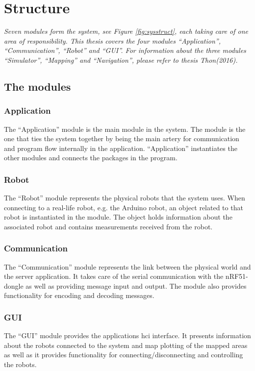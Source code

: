 \section{Structure}
\textit{Seven modules form the system, see Figure \ref{fig:sysstruct}, each taking care of one area of responsibility. This thesis covers the four modules ``Application'', ``Communication'', ``Robot'' and ``GUI''. For information about the three modules ``Simulator'', ``Mapping'' and ``Navigation'', please refer to thesis Thon(2016).}

\subsection{The modules}
\subsubsection{Application}
The ``Application'' module is the main module in the system. The module is the one that ties the system together by being the main artery for communication and program flow internally in the application. ``Application'' instantiates the other modules and connects the packages in the program.

\subsubsection{Robot}
The ``Robot'' module represents the physical robots that the system uses. When connecting to a real-life robot, e.g. the Arduino robot, an object related to that robot is instantiated in the module. The object holds information about the associated robot and contains measurements received from the robot.

\subsubsection{Communication}
The ``Communication'' module represents the link between the physical world and the server application. It takes care of the serial communication with the nRF51-dongle as well as providing message input and output. The module also provides functionality for encoding and decoding messages.

\subsubsection{GUI}
The ``GUI'' module provides the applications \acrshort{hci} interface. It presents information about the robots connected to the system and map plotting of the mapped areas as well as it provides functionality for connecting/disconnecting and controlling the robots.

